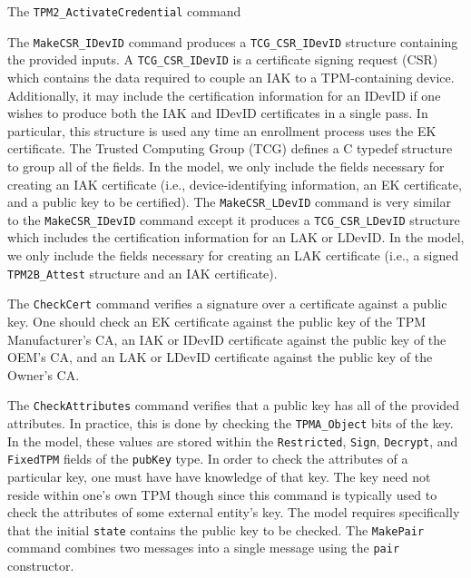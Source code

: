 The \verb|TPM2_ActivateCredential| command


The \verb|MakeCSR_IDevID| command produces a \verb|TCG_CSR_IDevID| structure containing the provided inputs. 
 A \verb|TCG_CSR_IDevID| is a certificate signing request (CSR) which contains the data required to couple an IAK to a TPM-containing device. Additionally, it may include the certification information for an IDevID if one wishes to produce both the IAK and IDevID certificates in a single pass. In particular, this structure is used any time an enrollment process uses the EK certificate. The Trusted Computing Group (TCG) defines a C typedef structure to group all of the fields. In the model, we only include the fields necessary for creating an IAK certificate (i.e., device-identifying information, an EK certificate, and a public key to be certified). The \verb|MakeCSR_LDevID| command is very similar to the \verb|MakeCSR_IDevID| command except it produces a \verb|TCG_CSR_LDevID| structure which includes the certification information for an LAK or LDevID. In the model, we only include the fields necessary for creating an LAK certificate (i.e., a signed \verb|TPM2B_Attest| structure and an IAK certificate).

The \verb|CheckCert| command verifies a signature over a certificate against a public key. One should check an EK certificate against the public key of the TPM Manufacturer's CA, an IAK or IDevID certificate against the public key of the OEM's CA, and an LAK or LDevID certificate against the public key of the Owner's CA.

The \verb|CheckAttributes| command verifies that a public key has all of the provided attributes. In practice, this is done by checking the \verb|TPMA_Object|  bits of the key. In the model, these values are stored within the \verb|Restricted|, \verb|Sign|, \verb|Decrypt|, and \verb|FixedTPM| fields of the \verb|pubKey| type. In order to check the attributes of a particular key, one must have have knowledge of that key. The key need not reside within one's own TPM though since this command is typically used to check the attributes of some external entity's key. The model requires specifically that the initial \verb|state| contains the public key to be checked. The \verb|MakePair| command combines two messages into a single message using the \verb|pair| constructor.










